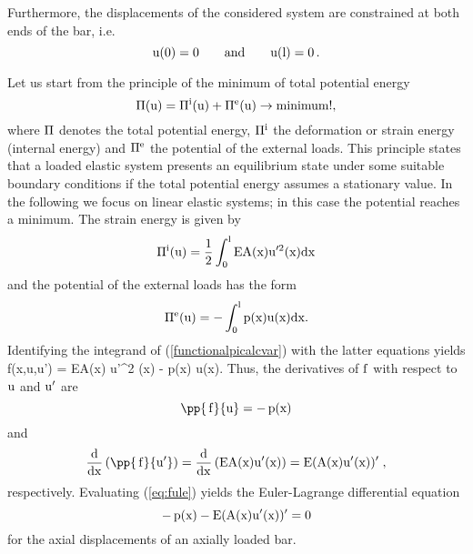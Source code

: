 Furthermore, the displacements of the 
considered system are constrained at both ends of the bar, i.e. 
\begin{equation}
\rm
u(0) = 0 \qquad \mbox{and} \qquad u(l)=0 \, . 
\end{equation}

Let us start from the principle of the minimum of total potential energy 
\begin{equation}
\rm
\Pi(u) = \Pi^i (u) + \Pi^e (u) \rightarrow \mbox{minimum!},
\end{equation}
where 
$ \rm \Pi $
denotes the total potential energy,  
$\rm \Pi^i$
the deformation or strain energy (internal energy)
and $\rm \Pi^e$ the potential of the external loads.
This principle states that a loaded elastic system presents an
equilibrium state under some suitable boundary conditions if the 
total potential energy assumes a stationary value. In the following 
we focus on linear elastic systems; in this case the potential reaches
a minimum.  
The strain energy is given by 
\begin{equation}
\rm
\Pi^i (u) = \dfrac{1}{2}\int_0^l EA(x) u'^2(x) dx 
\end{equation}
and 
the potential of the external loads
has the form
\begin{equation}
\rm
\Pi^e (u) = - \int_0^l p(x) u(x) dx .
\end{equation}
Identifying the integrand of (\ref{functionalpicalcvar})
with the latter equations yields
\eb
\rm
f(x,u,u') =  EA(x) u'^2 (x) - p(x) u(x). 
\ee
Thus, the derivatives of $\rm f$ with respect to 
$\rm u$ and  $\rm u^{\prime}$ are 
\begin{equation}
\rm
\pp{ \, f}{u} 
= - \, p(x) 
\end{equation}
and 
\begin{equation}
\rm
\frac{d}{dx} \left( \pp{ \, f}{u'} \right) 
= \frac{d}{dx} \left( EA(x) u^{\prime} (x) \right) 
= E (A (x) u' (x) )' \; , 
\end{equation}
respectively. 
Evaluating (\ref{eq:fule}) yields the Euler-Lagrange differential equation 
\begin{equation}
\rm
- \, p(x) - E (A (x) u' (x) )' = 0 
\end{equation}
for the axial displacements of an axially loaded bar. 


